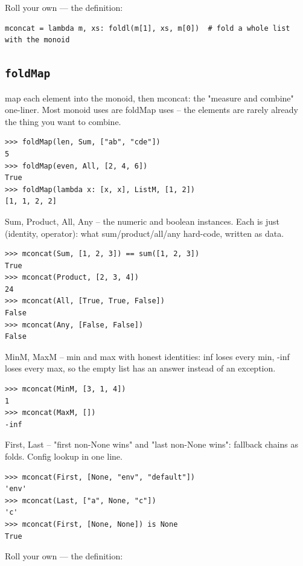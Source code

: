 \documentclass[10pt,letterpaper]{book}
\begin{document}
Roll your own --- the definition:

\begin{lstlisting}[style=ex]
mconcat = lambda m, xs: foldl(m[1], xs, m[0])  # fold a whole list with the monoid
\end{lstlisting}

\subsection{\texttt{foldMap}}\label{def:foldMap}
map each element into the monoid, then mconcat: the "measure and combine" one-liner. Most monoid uses are foldMap uses -- the elements are rarely already the thing you want to combine.
\begin{lstlisting}[style=ex]
>>> foldMap(len, Sum, ["ab", "cde"])
5
>>> foldMap(even, All, [2, 4, 6])
True
>>> foldMap(lambda x: [x, x], ListM, [1, 2])
[1, 1, 2, 2]
\end{lstlisting}

Sum, Product, All, Any -- the numeric and boolean instances. Each is just (identity, operator): what sum/product/all/any hard-code, written as data.

\begin{lstlisting}[style=ex]
>>> mconcat(Sum, [1, 2, 3]) == sum([1, 2, 3])
True
>>> mconcat(Product, [2, 3, 4])
24
>>> mconcat(All, [True, True, False])
False
>>> mconcat(Any, [False, False])
False
\end{lstlisting}

MinM, MaxM -- min and max with honest identities: inf loses every min, -inf loses every max, so the empty list has an answer instead of an exception.

\begin{lstlisting}[style=ex]
>>> mconcat(MinM, [3, 1, 4])
1
>>> mconcat(MaxM, [])
-inf
\end{lstlisting}

First, Last -- "first non-None wins" and "last non-None wins": fallback chains as folds. Config lookup in one line.

\begin{lstlisting}[style=ex]
>>> mconcat(First, [None, "env", "default"])
'env'
>>> mconcat(Last, ["a", None, "c"])
'c'
>>> mconcat(First, [None, None]) is None
True
\end{lstlisting}

Roll your own --- the definition:
\end{document}
